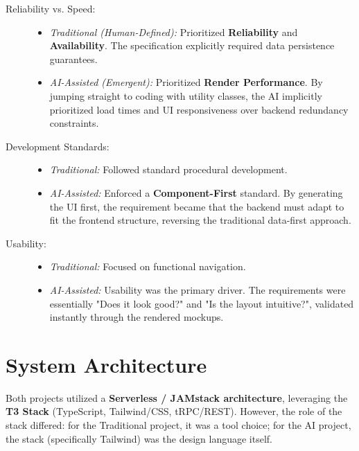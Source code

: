 \documentclass[a4paper,12pt]{report}
\begin{document}
\begin{description}
    \item[Reliability vs. Speed:]
    \begin{itemize}
        \item \textit{Traditional (Human-Defined):} Prioritized \textbf{Reliability} and \textbf{Availability}. The specification explicitly required data persistence guarantees.
        \item \textit{AI-Assisted (Emergent):} Prioritized \textbf{Render Performance}. By jumping straight to coding with utility classes, the AI implicitly prioritized load times and UI responsiveness over backend redundancy constraints.
    \end{itemize}
    
    \item[Development Standards:]
    \begin{itemize}
        \item \textit{Traditional:} Followed standard procedural development.
        \item \textit{AI-Assisted:} Enforced a \textbf{Component-First} standard. By generating the UI first, the requirement became that the backend must adapt to fit the frontend structure, reversing the traditional data-first approach.
    \end{itemize}

    \item[Usability:]
    \begin{itemize}
        \item \textit{Traditional:} Focused on functional navigation.
        \item \textit{AI-Assisted:} Usability was the primary driver. The requirements were essentially "Does it look good?" and "Is the layout intuitive?", validated instantly through the rendered mockups.
    \end{itemize}
\end{description}

\section{System Architecture}

Both projects utilized a \textbf{Serverless / JAMstack architecture}, leveraging the \textbf{T3 Stack} (TypeScript, Tailwind/CSS, tRPC/REST). However, the role of the stack differed: for the Traditional project, it was a tool choice; for the AI project, the stack (specifically Tailwind) was the design language itself.
\end{document}
